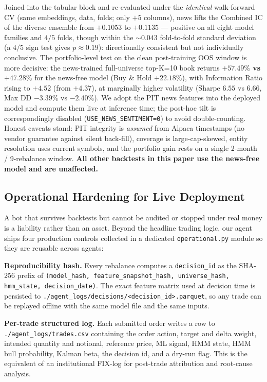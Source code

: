 \documentclass[10pt,journal,compsoc]{IEEEtran}
\begin{document}
Joined into the tabular block and re-evaluated under the \emph{identical} walk-forward CV (same embeddings, data, folds; only $+5$ columns), news lifts the Combined IC of the diverse ensemble from $+0.1053$ to $+0.1135$ --- positive on all eight model families and $4/5$ folds, though within the $\sim\!0.043$ fold-to-fold standard deviation (a $4/5$ sign test gives $p\!\approx\!0.19$): directionally consistent but not individually conclusive. The portfolio-level test on the clean post-training OOS window is more decisive: the news-trained full-universe top-K=10 book returns \textbf{$+57.49\%$ vs $+47.28\%$} for the news-free model (Buy \& Hold $+22.18\%$), with Information Ratio rising to $+4.52$ (from $+4.37$), at marginally higher volatility (Sharpe $6.55$ vs $6.66$, Max DD $-3.39\%$ vs $-2.40\%$). We adopt the PIT news features into the deployed model and compute them live at inference time; the post-hoc tilt is correspondingly disabled (\texttt{USE\_NEWS\_SENTIMENT=0}) to avoid double-counting. Honest caveats stand: PIT integrity is \emph{assumed} from Alpaca timestamps (no vendor guarantee against silent back-fill), coverage is large-cap-skewed, entity resolution uses current symbols, and the portfolio gain rests on a single 2-month / 9-rebalance window. \textbf{All other backtests in this paper use the news-free model and are unaffected.}

\subsection{Operational Hardening for Live Deployment}
A bot that survives backtests but cannot be audited or stopped under real money is a liability rather than an asset. Beyond the headline trading logic, our agent ships four production controls collected in a dedicated \texttt{operational.py} module so they are reusable across agents:

\textbf{Reproducibility hash.} Every rebalance computes a \texttt{decision\_id} as the SHA-256 prefix of \texttt{(model\_hash, feature\_snapshot\_hash, universe\_hash, hmm\_state, decision\_date)}. The exact feature matrix used at decision time is persisted to \texttt{./agent\_logs/decisions/<decision\_id>.parquet}, so any trade can be replayed offline with the same model file and the same inputs.

\textbf{Per-trade structured log.} Each submitted order writes a row to \texttt{./agent\_logs/trades.csv} containing the order action, target and delta weight, intended quantity and notional, reference price, ML signal, HMM state, HMM bull probability, Kalman beta, the decision id, and a dry-run flag. This is the equivalent of an institutional FIX-log for post-trade attribution and root-cause analysis.
\end{document}
